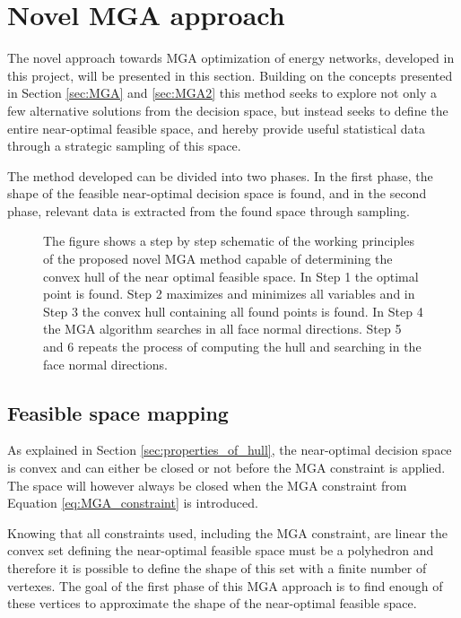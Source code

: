 \section{Novel MGA approach}\label{sec:Novel_MGA}

The novel approach towards MGA optimization of energy networks, developed in this project, will be presented in this section. Building on the concepts presented in Section \ref{sec:MGA} and \ref{sec:MGA2} this method seeks to explore not only a few alternative solutions from the decision space, but instead seeks to define the entire near-optimal feasible space, and hereby provide useful statistical data through a strategic sampling of this space. 

The method developed can be divided into two phases. In the first phase, the shape of the feasible near-optimal decision space is found, and in the second phase, relevant data is extracted from the found space through sampling. 

\begin{figure}[p]
	\centering
	\caption{The figure shows a step by step schematic of the working principles of the proposed novel MGA method capable of determining the convex hull of the near optimal feasible space. In Step 1 the optimal point is found. Step 2 maximizes and minimizes all variables and in Step 3 the convex hull containing all found points is found. In Step 4 the MGA algorithm searches in all face normal directions. Step 5 and 6 repeats the process of computing the hull and searching in the face normal directions.}
	\label{fig:step_by_step}
\end{figure}

\subsection{Feasible space mapping}
As explained in Section \ref{sec:properties_of_hull}, the near-optimal decision space is convex and can either be closed or not before the MGA constraint is applied. The space will however always be closed when the MGA constraint from Equation \ref{eq:MGA_constraint} is introduced.

Knowing that all constraints used, including the MGA constraint, are linear the convex set defining the near-optimal feasible space must be a polyhedron and therefore it is possible to define the shape of this set with a finite number of vertexes. The goal of the first phase of this MGA approach is to find enough of these vertices to approximate the shape of the near-optimal feasible space. 

